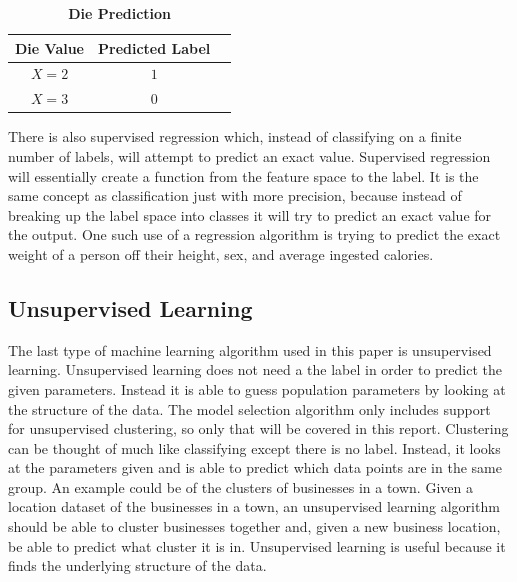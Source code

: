 \documentclass[9pt,twocolumn,twoside]{idsi}
\begin{document}
\begin{table}[htbp]
\centering
\caption{\bf Die Prediction}
\begin{tabular}{ccc}
\hline
Die Value & Predicted Label \\
\hline
$X = 2$ & $1$ \\
$X = 3$ & $0$ \\
\hline
\end{tabular}
  \label{tab:Die-predict}
\end{table}

There is also supervised regression which, instead of classifying on a finite number of labels, will attempt to predict an exact value. Supervised regression will essentially create a function from the feature space to the label. It is the same concept as classification just with more precision, because instead of breaking up the label space into classes it will try to predict an exact value for the output. One such use of a regression algorithm is trying to predict the exact weight of a person off their height, sex, and average ingested calories.

\subsection{Unsupervised Learning}
The last type of machine learning algorithm used in this paper is unsupervised learning. Unsupervised learning does not need a the label in order to predict the given parameters. Instead it is able to guess population parameters by looking at the structure of the data. The model selection algorithm only includes support for unsupervised clustering, so only that will be covered in this report. Clustering can be thought of much like classifying except there is no label. Instead, it looks at the parameters given and is able to predict which data points are in the same group. An example could be of the clusters of businesses in a town. Given a location dataset of the businesses in a town, an unsupervised learning algorithm should be able to cluster businesses together and, given a new business location, be able to predict what cluster it is in. Unsupervised learning is useful because it finds the underlying structure of the data. 
\end{document}
